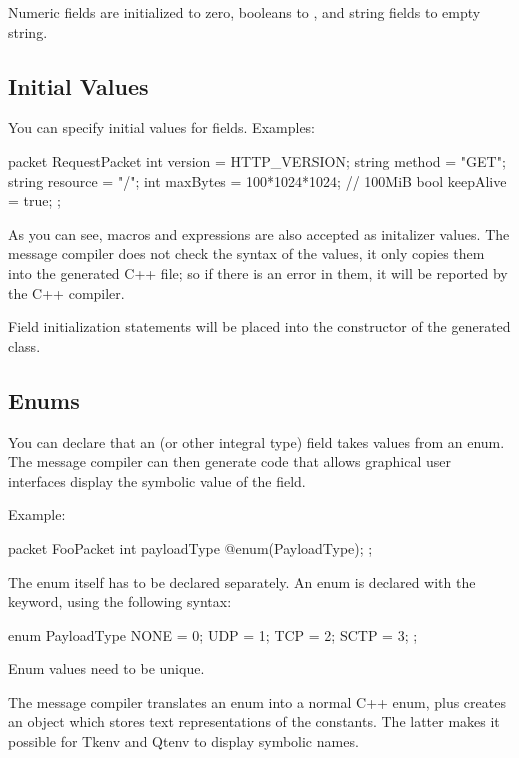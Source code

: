 Numeric fields are initialized to zero, booleans to , and string
fields to empty string.


\subsection{Initial Values}
\label{sec:ch-msg-defs:initial-values}

You can specify initial values for fields. Examples:

\begin{msg}
packet RequestPacket
{
    int version = HTTP_VERSION;
    string method = "GET";
    string resource = "/";
    int maxBytes = 100*1024*1024; // 100MiB
    bool keepAlive = true;
};
\end{msg}

As you can see, macros and expressions are also accepted as initalizer
values. The message compiler does not check the syntax of the values, it
only copies them into the generated C++ file; so if there is an error in
them, it will be reported by the C++ compiler.

Field initialization statements will be placed into the constructor of the
generated class.


\subsection{Enums}
\label{sec:ch-msg-defs:enums}

You can declare that an  (or other integral type) field
takes values from an enum. The message compiler can then generate code
that allows graphical user interfaces display the symbolic value of the field.

Example:

\begin{msg}
packet FooPacket
{
    int payloadType @enum(PayloadType);
};
\end{msg}

The enum itself has to be declared separately. An enum is declared with
the  keyword, using the following syntax:

\begin{msg}
enum PayloadType
{
   NONE = 0;
   UDP = 1;
   TCP = 2;
   SCTP = 3;
};
\end{msg}

Enum values need to be unique.

The message compiler translates an enum into a normal C++ enum, plus
creates an object which stores text representations of the constants. The
latter makes it possible for Tkenv and Qtenv to display symbolic names.

